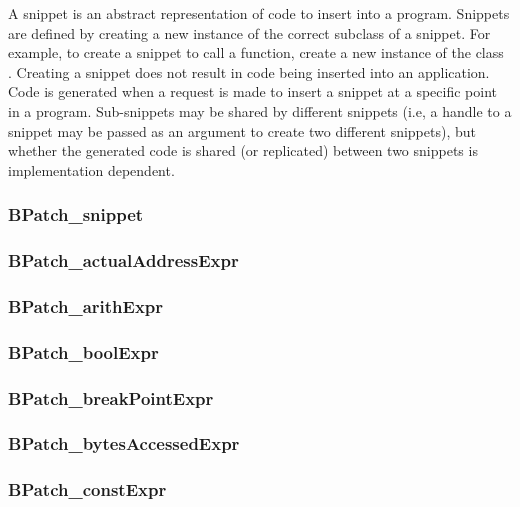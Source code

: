 A snippet is an abstract representation of code to insert into a
program. Snippets are defined by creating a new instance of the
correct subclass of a snippet. For example, to create
a snippet to call a function, create a new instance of the class
. Creating a snippet does
not result in code being inserted into an application. Code is
generated when a request is made to insert a
snippet at a specific point in a program. Sub-snippets may be shared
by different snippets (i.e, a handle to a
snippet may be passed as an argument to create two different
snippets), but whether the generated code is shared (or
replicated) between two snippets is implementation dependent.

\subsubsection{BPatch\_snippet}


\subsubsection{BPatch\_actualAddressExpr}


\subsubsection{BPatch\_arithExpr}


\subsubsection{BPatch\_boolExpr}


\subsubsection{BPatch\_breakPointExpr}


\subsubsection{BPatch\_bytesAccessedExpr}


\subsubsection{BPatch\_constExpr}


